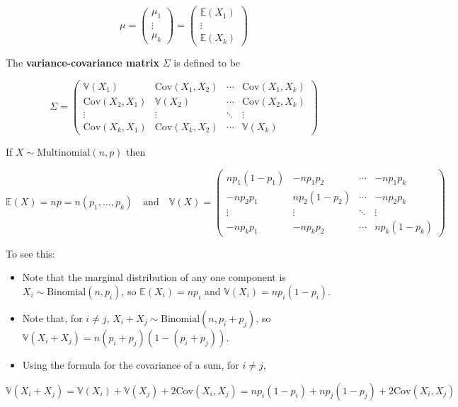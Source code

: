 \[ \mu = \begin{pmatrix} \mu_1 \\ \vdots \\ \mu_k \end{pmatrix} = \begin{pmatrix} \mathbb{E}(X_1) \\ \vdots \\ \mathbb{E}(X_k) \end{pmatrix} \]

The \textbf{variance-covariance matrix} \(\Sigma\) is defined to be

\[ \Sigma = \begin{pmatrix}
\mathbb{V}(X_1) & \text{Cov}(X_1, X_2) & \cdots & \text{Cov}(X_1, X_k) \\
\text{Cov}(X_2, X_1) & \mathbb{V}(X_2) & \cdots & \text{Cov}(X_2, X_k) \\
\vdots & \vdots & \ddots & \vdots \\
\text{Cov}(X_k, X_1) & \text{Cov}(X_k, X_2) & \cdots & \mathbb{V}(X_k)
\end{pmatrix} \]

If \(X \sim \text{Multinomial}(n, p)\) then

\[ 
\mathbb{E}(X) = np = n(p_1, \dots, p_k)
\quad \text{and} \quad
\mathbb{V}(X) = \begin{pmatrix}
np_1(1 - p_1) & -np_1p_2 & \cdots & -np_1p_k \\
-np_2p_1 & np_2(1 - p_2) & \cdots & -np_2p_k \\
\vdots & \vdots & \ddots & \vdots \\
-np_kp_1 & -np_kp_2 & \cdots & np_k(1 - p_k)
\end{pmatrix} \]

To see this:

\begin{itemize}[tightlist]
\item
  Note that the marginal distribution of any one component is
  \(X_i \sim \text{Binomial}(n, p_i)\), so \(\mathbb{E}(X_i) = np_i\)
  and \(\mathbb{V}(X_i) = np_i(1 - p_i)\).\\
\item
  Note that, for \(i \neq j\),
  \(X_i + X_j \sim \text{Binomial}(n, p_i + p_j)\), so
  \(\mathbb{V}(X_i + X_j) = n(p_i + p_j)(1 - (p_i + p_j))\).
\item
  Using the formula for the covariance of a sum, for \(i \neq j\),
\end{itemize}

\[ \mathbb{V}(X_i + X_j) = \mathbb{V}(X_i) + \mathbb{V}(X_j) + 2 \text{Cov}(X_i, X_j) =  np_i(1 - p_i) + np_j(1 - p_j) + 2 \text{Cov}(X_i, X_j) \]

